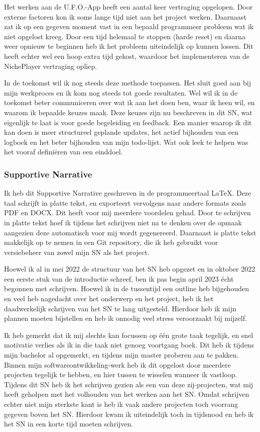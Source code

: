 Het werken aan de U.F.O.-App heeft een aantal keer vertraging opgelopen. Door externe factoren kon ik soms lange tijd niet aan het project werken. Daarnaast zat ik op een gegeven moment vast in een bepaald programmeer probleem wat ik niet opgelost kreeg. Door een tijd helemaal te stoppen (harde reset) en daarna weer opnieuw te beginnen heb ik het probleem uiteindelijk op kunnen lossen. Dit heeft echter wel een hoop extra tijd gekost, waardoor het implementeren van de NichePlayer vertraging opliep.

In de toekomst wil ik nog steeds deze methode toepassen. Het sluit goed aan bij mijn werkproces en ik kom nog steeds tot goede resultaten. Wel wil ik in de toekomst beter communiceren over wat ik aan het doen ben, waar ik heen wil, en waarom ik bepaalde keuzes maak. Deze keuzes zijn nu beschreven in dit SN, wat eigenlijk te laat is voor goede begeleiding en feedback. Een manier waarop ik dit kan doen is meer structureel geplande updates, het actief bijhouden van een logboek en het beter bijhouden van mijn todo-lijst. Wat ook leek te helpen was het vooraf definiëren van een einddoel.

\subsubsection*{Supportive Narrative}
Ik heb dit Supportive Narrative geschreven in de programmeertaal LaTeX. Deze taal schrijft in platte tekst, en exporteert vervolgens naar andere formats zoals PDF en DOCX. Dit heeft voor mij meerdere voordelen gehad. Door te schrijven in platte tekst hoef ik tijdens het schrijven niet na te denken over de opmaak aangezien deze automatisch voor mij wordt gegenereerd. Daarnaast is platte tekst makkelijk op te nemen in een Git repository, die ik heb gebruikt voor versiebeheer van zowel mijn SN als het project.

Hoewel ik al in mei 2022 de structuur van het SN heb opgezet en in oktober 2022 een eerste stuk van de introductie schreef, ben ik pas begin april 2023 écht begonnen met schrijven. Hoewel ik in de tussentijd een outline heb bijgehouden en veel heb nagedacht over het onderwerp en het project, heb ik het daadwerkelijk schrijven van het SN te lang uitgesteld. Hierdoor heb ik mijn plannen moeten bijstellen en heb ik onnodig veel stress veroorzaakt bij mijzelf. 

Ik heb gemerkt dat ik mij slechts kan focussen op één grote taak tegelijk, en snel motivatie verlies als ik in die taak niet genoeg voortgang boek. Dit heb ik tijdens mijn bachelor al opgemerkt, en tijdens mijn master proberen aan te pakken. Binnen mijn softwareontwikkeling-werk heb ik dit opgelost door meerdere projecten tegelijk te hebben, en hier tussen te wisselen wanneer ik vastloop. Tijdens dit SN heb ik het schrijven gezien als een van deze zij-projecten, wat mij heeft geholpen met het volhouden van het werken aan het SN. Omdat schrijven echter niet mijn sterkste kant is heb ik vaak andere projecten toch voorrang gegeven boven het SN. Hierdoor kwam ik uiteindelijk toch in tijdsnood en heb ik het SN in een korte tijd moeten schrijven.

